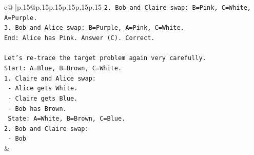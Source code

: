 \documentclass{article}
\begin{document}
{\begin{supertabular}{c@{$\;$}|p{.15\linewidth}@{}p{.15\linewidth}p{.15\linewidth}p{.15\linewidth}p{.15\linewidth}p{.15\linewidth}}
{{{\texttt{2. Bob and Claire swap: B=Pink, C=White, A=Purple.} \\
\texttt{3. Bob and Alice swap: B=Purple, A=Pink, C=White.} \\
\texttt{End: Alice has Pink. Answer (C). Correct.} \\
\\ 
\texttt{Let's re{-}trace the target problem again very carefully.} \\
\texttt{Start: A=Blue, B=Brown, C=White.} \\
\texttt{1. Claire and Alice swap:} \\
\texttt{   {-} Alice gets White.} \\
\texttt{   {-} Claire gets Blue.} \\
\texttt{   {-} Bob has Brown.} \\
\texttt{   State: A=White, B=Brown, C=Blue.} \\
\texttt{2. Bob and Claire swap:} \\
\texttt{   {-} Bob} \\
            }
        }
    }
    & \\ \\

\end{supertabular}
}
\end{document}
